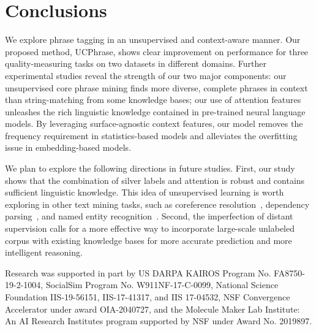 \documentclass[sigconf]{acmart}
\newcommand{\our}{\mbox{UCPhrase}\xspace}
\begin{document}
 \section{Conclusions}
We explore phrase tagging in an unsupervised and context-aware manner. 
Our proposed method, \our, shows clear improvement on performance for three quality-measuring tasks on two datasets in different domains. 
Further experimental studies reveal the strength of our two major components: our unsupervised core phrase mining finds more diverse, complete phrases in context than string-matching from some knowledge bases; 
our use of attention features unleashes the rich linguistic knowledge contained in pre-trained neural language models. 
By leveraging surface-agnostic context features, our model removes the frequency requirement in statistics-based models and alleviates the overfitting issue in embedding-based models.

We plan to explore the following directions in future studies. 
First, our study shows that the combination of silver labels and attention is robust and contains sufficient linguistic knowledge. 
This idea of unsupervised learning is worth exploring in other text mining tasks, such as coreference resolution~\cite{mccarthy1995using}, dependency parsing~\cite{kubler2009dependency}, and named entity recognition~\cite{nadeau2007survey}. 
Second, the imperfection of distant supervision calls for a more effective way to incorporate large-scale unlabeled corpus with existing knowledge bases for more accurate prediction and more intelligent reasoning. \begin{acks}
Research was supported in part by US DARPA KAIROS Program No. FA8750-19-2-1004, SocialSim Program No. W911NF-17-C-0099, National Science Foundation IIS-19-56151, IIS-17-41317, and IIS 17-04532, NSF Convergence Accelerator under award OIA-2040727, and the Molecule Maker Lab Institute: An AI Research Institutes program supported by NSF under Award No. 2019897. 
\end{acks}




\appendix
\end{document}
